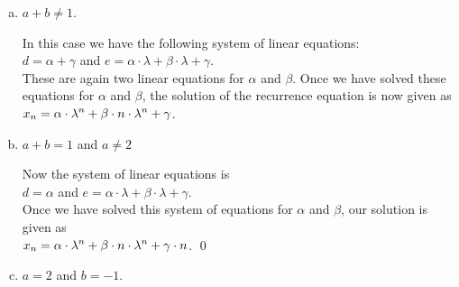 \begin{enumerate}[(a)]
\item $a + b \not = 1$.

      In this case we have the following system of linear equations:
      \\[0.2cm]
      \hspace*{1.3cm}
      $d = \alpha + \gamma$ \quad and \quad $e = \alpha \cdot \lambda + \beta \cdot \lambda + \gamma$.
      \\[0.2cm]
      These are again two linear equations for $\alpha$ and $\beta$.  
      Once we have solved these equations for $\alpha$ and
      $\beta$, the solution of the recurrence equation is now given as
      \\[0.2cm]
      \hspace*{1.3cm}
      $\displaystyle x_{n} = \alpha \cdot \lambda^n + \beta \cdot n \cdot \lambda^n + \gamma$.
\item $a + b = 1$ \quad and $a \not= 2$
    
      Now the system of linear equations is 
      \\[0.2cm]
      \hspace*{1.3cm}
      $d = \alpha$ \quad and \quad $e = \alpha \cdot \lambda + \beta \cdot \lambda + \gamma$. 
      \\[0.2cm]
      Once we have solved this system of equations for $\alpha$ and $\beta$, our solution is given as
      \\[0.2cm]
      \hspace*{1.3cm}
      $\displaystyle x_{n} = \alpha \cdot \lambda^n + \beta \cdot n \cdot \lambda^n + \gamma \cdot n$. \qed
\item $a = 2$ and $b = -1$.


\end{enumerate}
